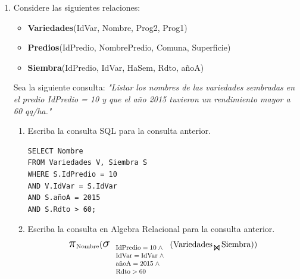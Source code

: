\documentclass{templateNote}
\begin{document}
\begin{enumerate}
    \newpage
    \item Considere las siguientes relaciones:
    \begin{itemize}
        \item \textbf{Variedades}(IdVar, Nombre, Prog2, Prog1)

        \item \textbf{Predios}(IdPredio, NombrePredio, Comuna, Superficie)

        \item \textbf{Siembra}(IdPredio, IdVar, HaSem, Rdto, añoA)
    \end{itemize}
    Sea la siguiente consulta: \newline
    \textit{"Listar los nombres de las variedades sembradas en el predio IdPredio = 10 y que el año 2015 tuvieron un rendimiento mayor a 60 qq/ha."}
    \begin{enumerate}
        \item Escriba la consulta SQL para la consulta anterior.
        \begin{tcolorbox}[
            colback=Verde!30,
            colframe=Verde!90!black]
            \begin{verbatim}
SELECT Nombre
FROM Variedades V, Siembra S
WHERE S.IdPredio = 10
AND V.IdVar = S.IdVar
AND S.añoA = 2015
AND S.Rdto > 60;
            \end{verbatim}
        \end{tcolorbox}
        \item Escriba la consulta en Algebra Relacional para la consulta anterior.
        \begin{align*}
            \scalebox{1.5}{$\pi$}_{\text{Nombre}} (
                \scalebox{1.5}{$\sigma$}_{
                    \scalebox{0.8}{
                        $\begin{array}{l}
                            \text{IdPredio} = 10 \; \wedge \\
                            \text{IdVar} = \text{IdVar} \; \wedge \\
                            \text{a\~noA} = 2015 \; \wedge \\
                            \text{Rdto} > 60
                        \end{array}$
                    }
                } (
                    \text{Variedades}_{\scalebox{1.3}{$\Join$}} \text{Siembra}
                )
            )
        \end{align*}


\end{enumerate}
\end{enumerate}
\end{document}

